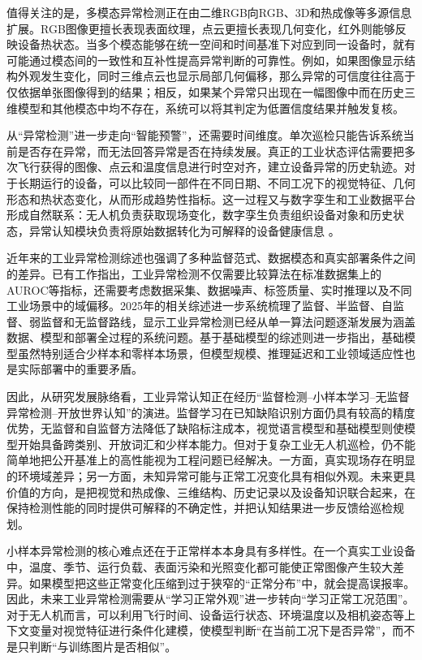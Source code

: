 值得关注的是，多模态异常检测正在由二维RGB向RGB、3D和热成像等多源信息扩展。RGB图像更擅长表现表面纹理，点云更擅长表现几何变化，红外则能够反映设备热状态。当多个模态能够在统一空间和时间基准下对应到同一设备时，就有可能通过模态间的一致性和互补性提高异常判断的可靠性。例如，如果图像显示结构外观发生变化，同时三维点云也显示局部几何偏移，那么异常的可信度往往高于仅依据单张图像得到的结果；相反，如果某个异常只出现在一幅图像中而在历史三维模型和其他模态中均不存在，系统可以将其判定为低置信度结果并触发复核。

从“异常检测”进一步走向“智能预警”，还需要时间维度。单次巡检只能告诉系统当前是否存在异常，而无法回答异常是否在持续发展。真正的工业状态评估需要把多次飞行获得的图像、点云和温度信息进行时空对齐，建立设备异常的历史轨迹。对于长期运行的设备，可以比较同一部件在不同日期、不同工况下的视觉特征、几何形态和热状态变化，从而形成趋势性指标。这一过程又与数字孪生和工业数据平台形成自然联系：无人机负责获取现场变化，数字孪生负责组织设备对象和历史状态，异常认知模块负责将原始数据转化为可解释的设备健康信息
\cite{tao2019digital}。

近年来的工业异常检测综述也强调了多种监督范式、数据模态和真实部署条件之间的差异。已有工作指出，工业异常检测不仅需要比较算法在标准数据集上的AUROC等指标，还需要考虑数据采集、数据噪声、标签质量、实时推理以及不同工业场景中的域偏移。2025年的相关综述进一步系统梳理了监督、半监督、自监督、弱监督和无监督路线，显示工业异常检测已经从单一算法问题逐渐发展为涵盖数据、模型和部署全过程的系统问题。基于基础模型的综述则进一步指出，基础模型虽然特别适合少样本和零样本场景，但模型规模、推理延迟和工业领域适应性也是实际部署中的重要矛盾。

因此，从研究发展脉络看，工业异常认知正在经历“监督检测--小样本学习--无监督异常检测--开放世界认知”的演进。监督学习在已知缺陷识别方面仍具有较高的精度优势，无监督和自监督方法降低了缺陷标注成本，视觉语言模型和基础模型则使模型开始具备跨类别、开放词汇和少样本能力。但对于复杂工业无人机巡检，仍不能简单地把公开基准上的高性能视为工程问题已经解决。一方面，真实现场存在明显的环境域差异；另一方面，未知异常可能与正常工况变化具有相似外观。未来更具价值的方向，是把视觉和热成像、三维结构、历史记录以及设备知识联合起来，在保持检测性能的同时提供可解释的不确定性，并把认知结果进一步反馈给巡检规划。



小样本异常检测的核心难点还在于正常样本本身具有多样性。在一个真实工业设备中，温度、季节、运行负载、表面污染和光照变化都可能使正常图像产生较大差异。如果模型把这些正常变化压缩到过于狭窄的“正常分布”中，就会提高误报率。因此，未来工业异常检测需要从“学习正常外观”进一步转向“学习正常工况范围”。对于无人机而言，可以利用飞行时间、设备运行状态、环境温度以及相机姿态等上下文变量对视觉特征进行条件化建模，使模型判断“在当前工况下是否异常”，而不是只判断“与训练图片是否相似”。

